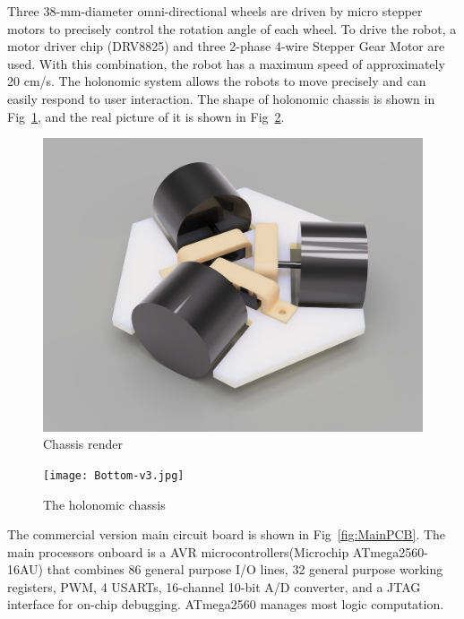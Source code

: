 \documentclass[sigconf]{acmart}
\begin{document}
Three 38-mm-diameter omni-directional wheels are driven by micro stepper motors to precisely control the rotation angle of each wheel. To drive the robot, a motor driver chip (DRV8825) and three 2-phase 4-wire Stepper Gear Motor are used. With this combination, the robot has a maximum speed of approximately 20 cm/s. The holonomic system allows the robots to move precisely and can easily respond to user interaction. The shape of holonomic chassis is shown in Fig~\ref{fig:ChassisRender}, and the real picture of it is shown in Fig~\ref{fig:chassis}.

\begin{figure}[h]
  \centering
  \includegraphics[width=\linewidth]{Assembled.png}
  \caption{Chassis render}
  \label{fig:ChassisRender}
\end{figure}

\begin{figure}[h]
  \centering
  \texttt{[image: Bottom-v3.jpg]}
  \caption{The holonomic chassis}
  \label{fig:chassis}
\end{figure}

The commercial version main circuit board is shown in Fig~\ref{fig:MainPCB}. The main processors onboard is a AVR microcontrollers(Microchip ATmega2560-16AU) that combines 86 general purpose I/O lines, 32 general purpose working registers, PWM, 4 USARTs, 16-channel 10-bit A/D converter, and a JTAG interface for on-chip debugging. ATmega2560 manages most logic computation.
\end{document}
